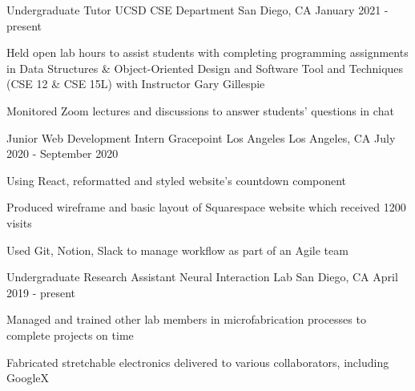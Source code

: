 \begin{cventries}
  \cventry
    {Undergraduate Tutor}
    {UCSD CSE Department}
    {San Diego, CA}
    {January 2021 - present}
    {
        \begin{cvitems}
          \item {Held open lab hours to assist students with completing programming assignments in Data Structures \& Object-Oriented Design and Software Tool and Techniques (CSE 12 \& CSE 15L) with Instructor Gary Gillespie}
          \item {Monitored Zoom lectures and discussions to answer students' questions in chat}
        \end{cvitems}
    }
  \cventry
    {Junior Web Development Intern}
    {Gracepoint Los Angeles}
    {Los Angeles, CA}
    {July 2020 - September 2020}
    {
      \begin{cvitems}
        \item {Using React, reformatted and styled website's countdown component}
        \item{Produced wireframe and basic layout of Squarespace website which received 1200 visits}
        \item {Used Git, Notion, Slack to manage workflow as part of an Agile team}
      \end{cvitems}
    }
  \cventry
    {Undergraduate Research Assistant}
    {Neural Interaction Lab}
    {San Diego, CA}
    {April 2019 - present}
    {
      \begin{cvitems}
        \item {Managed and trained other lab members in microfabrication processes to complete projects on time}
        \item {Fabricated stretchable electronics delivered to various collaborators, including GoogleX}
      \end{cvitems}
    }
\end{cventries}
